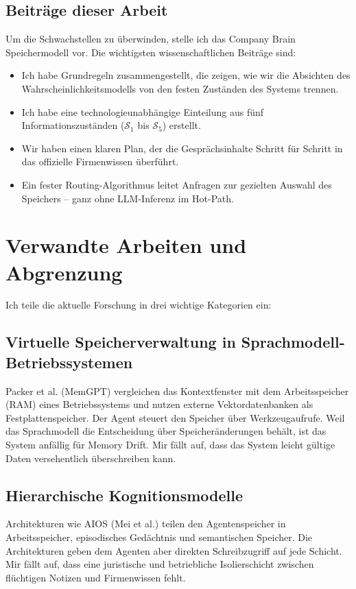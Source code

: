 \documentclass[10pt,journal,compsoc]{IEEEtran}
\begin{document}
\subsection{Beiträge dieser Arbeit}
Um die Schwachstellen zu überwinden, stelle ich das Company Brain Speichermodell vor. Die wichtigsten wissenschaftlichen Beiträge sind:
\begin{itemize}
    \item Ich habe Grundregeln zusammengestellt, die zeigen, wie wir die Absichten des Wahrscheinlichkeitsmodells von den festen Zuständen des Systems trennen.
    \item Ich habe eine technologieunabhängige Einteilung aus fünf Informationszuständen ($\mathcal{S}_1$ bis $\mathcal{S}_5$) erstellt.
    \item Wir haben einen klaren Plan, der die Gesprächsinhalte Schritt für Schritt in das offizielle Firmenwissen überführt.
    \item Ein fester Routing-Algorithmus leitet Anfragen zur gezielten Auswahl des Speichers -- ganz ohne LLM-Inferenz im Hot-Path.
\end{itemize}

\section{Verwandte Arbeiten und Abgrenzung}
\label{sec:verwandte_arbeiten}

Ich teile die aktuelle Forschung in drei wichtige Kategorien ein:

\subsection{Virtuelle Speicherverwaltung in Sprachmodell-Betriebssystemen}
Packer et al. (MemGPT) vergleichen das Kontextfenster mit dem Arbeitsspeicher (RAM) eines Betriebssystems und nutzen externe Vektordatenbanken als Festplattenspeicher. Der Agent steuert den Speicher über Werkzeugaufrufe. Weil das Sprachmodell die Entscheidung über Speicheränderungen behält, ist das System anfällig für Memory Drift. Mir fällt auf, dass das System leicht gültige Daten versehentlich überschreiben kann.

\subsection{Hierarchische Kognitionsmodelle}
Architekturen wie AIOS (Mei et al.) teilen den Agentenspeicher in Arbeitsspeicher, episodisches Gedächtnis und semantischen Speicher. Die Architekturen geben dem Agenten aber direkten Schreibzugriff auf jede Schicht. Mir fällt auf, dass eine juristische und betriebliche Isolierschicht zwischen flüchtigen Notizen und Firmenwissen fehlt.
\end{document}
